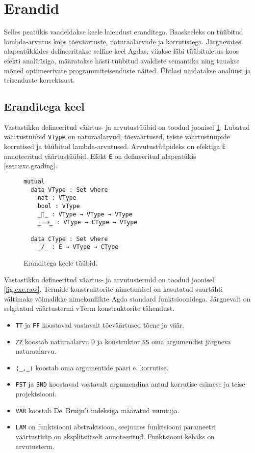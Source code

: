 \documentclass[a4paper,12pt]{article}
\begin{document}
\clearpage

\section{Erandid}

Selles peatükis vaadeldakse keele laiendust eranditega. 
Baaskeeleks on tüübitud lambda-arvutus koos tõeväärtuste, naturaalarvude ja korrutistega.
Järgnevates alapeatükkides defineeritakse selline keel Agdas,
viiakse läbi tüübituletus koos efekti analüüsiga,
määratakse hästi tüübitud avaldiste semantika
ning tuuakse mõned optimeerivate programmiteisenduste näited.
Ühtlasi näidatakse analüüsi ja teisenduste korrektsust.

\subsection{Eranditega keel}\label{ssec:exc.raw}

Vastastikku defineeritud väärtus- ja arvutustüübid on toodud joonisel \ref{fig:exc.types}.
Lubatud väärtustüübid {\tt VType} on naturaalarvud, tõeväärtused, teiste väärtustüüpide korrutised ja tüübitud lambda-arvutused.
Arvutustüüpideks on efektiga {\tt E} annoteeritud väärtustüübid. Efekt {\tt E} on defineeritud alapeatükis \ref{ssec:exc.grading}.
\begin{figure}
  \begin{verbatim}
mutual
  data VType : Set where
    nat : VType
    bool : VType
    _∏_ : VType → VType → VType
    _⟹_ : VType → CType → VType

  data CType : Set where
    _/_ : E → VType → CType\end{verbatim}
  \caption{Eranditega keele tüübid.}
  \label{fig:exc.types}
\end{figure}


Vastastikku defineeritud väärtus- ja arvutustermid on toodud joonisel \ref{fig:exc.raw}.
Termide konstruktorite nimetamisel on kasutatud suurtähti vältimaks võimalikke nimekonflikte Agda standard funktsioonidega.
Järgnevalt on selgitatud väärtustermi vTerm konstruktorite tähendust.
\begin{itemize}
  \item {\tt TT} ja {\tt FF} koostavad vastavalt tõeväärtused tõene ja väär.
  \item {\tt ZZ} koostab naturaalarvu 0 ja konstruktor {\tt SS} oma argumendist järgneva naturaalarvu.
  \item {\tt ⟨_,_⟩} koostab oma argumentide paari e. korrutise.
  \item {\tt FST} ja {\tt SND} koostavad vastavalt argumendina antud korrutise esimese ja teise projektsiooni.
  \item {\tt VAR} koostab De~Bruijn'i indeksiga määratud muutuja.
  \item {\tt LAM} on funktsiooni abstraktsioon, seejuures funktsiooni parameetri väärtustüüp on eksplitsiitselt annoteeritud. Funktsiooni kehaks on arvutusterm.
\end{itemize}
\end{document}
